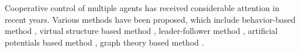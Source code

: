 \documentclass[letterpaper, 10 pt, conference]{ieeeconf}  %
\begin{document}
%


Cooperative control of multiple agents has received
considerable attention in recent years.  Various
methods have been proposed, which include behavior-based method
\cite{law03}, virtual structure based method \cite{bea01},
leader-follower method
 \cite{tan04}, artificial potentials based method
  \cite{leo01},
graph theory based method
\cite{dongFarrell}.
\end{document}
